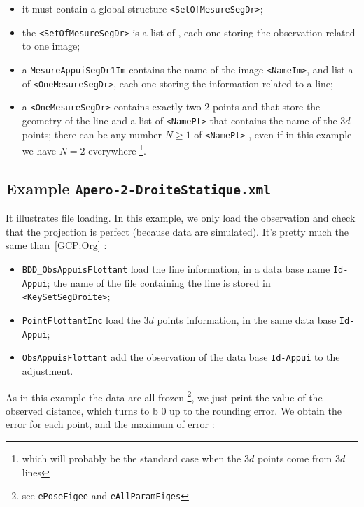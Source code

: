 \begin{itemize}
   \item it must contain a global structure {\tt <SetOfMesureSegDr>};
   \item the {\tt <SetOfMesureSegDr>} is a list of {\tt <MesureAppuiSegDr1Im>}, each one
         storing the observation related to one image;
   \item a  {\tt MesureAppuiSegDr1Im} contains the name of the image {\tt <NameIm>}, and list a of {\tt <OneMesureSegDr>}, each one storing the information related to a line;

   \item a   {\tt <OneMesureSegDr>} contains exactly two $2$ points {\tt <Pt1Im>} and {\tt <Pt2Im>} that store
            the geometry of the line and a list of {\tt <NamePt>} that contains the name of the $3d$ points;
            there can be any number $N \geq 1$ of  {\tt <NamePt>} , even if in this example we
             have $N=2$ everywhere
             \footnote{which will probably be the standard case when the $3d$ points come from $3d$ lines}.

\end{itemize}


\subsection{Example {\tt Apero-2-DroiteStatique.xml}}

\label{Apero-2-DroiteStatique}

It illustrates file loading.
In this example, we only load the observation and check that the projection is perfect (because data
are simulated). It's pretty much the same than~\ref{GCP:Org} :

\begin{itemize}
   \item {\tt BDD\_ObsAppuisFlottant} load the line information, in a data base name {\tt Id-Appui};
         the name of the file containing the line is stored in {\tt  <KeySetSegDroite>};
   \item {\tt PointFlottantInc} load the $3d$ points information, in the same data base {\tt Id-Appui};
   \item {\tt ObsAppuisFlottant} add the observation of the data base {\tt Id-Appui} to the adjustment.
\end{itemize}

As in this example the data are all frozen \footnote{see {\tt ePoseFigee} and {\tt eAllParamFiges}}, we just print the
value of the observed distance, which turns to b $0$ up to the rounding error. We obtain the error for each point, and
the maximum of error :


